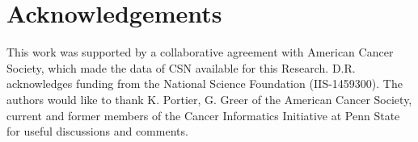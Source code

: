 \documentclass[man,biblatex,floatsintext]{apa6}
\begin{document}

\section*{Acknowledgements}
This work was supported by a collaborative agreement with
American Cancer Society, which made the data of CSN available for this Research. D.R. acknowledges funding from the National Science Foundation (IIS-1459300). The authors would like to thank K. Portier, G. Greer of the
American Cancer Society, current and former members of the Cancer 
Informatics Initiative at Penn State for useful discussions and comments.
 


\printbibliography
\end{document}

